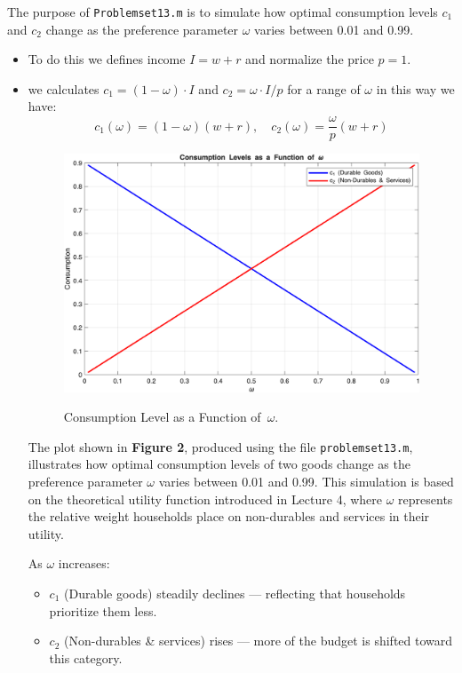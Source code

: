 \documentclass[12pt,a4paper,notitlepage]{article}
\numberwithin{equation}{section}
\begin{document}
The purpose of \texttt{Problemset13.m} is to simulate how optimal consumption levels \( c_1 \) and \( c_2 \) change as the preference parameter \( \omega \) varies between 0.01 and 0.99. 

\begin{itemize}
    \item To do this we defines income $I = w + r$ and normalize the price $p = 1$.
    \item we calculates $c_1 = (1 - \omega) \cdot I$ and $c_2 = \omega \cdot I / p$ for a range of $\omega$ in this way we have:
\[
c_1(\omega) = (1 - \omega)(w + r), \quad
c_2(\omega) = \frac{\omega}{p}(w + r)
\]



\begin{figure} [H]
	\centering
	\includegraphics[width = 1 \textwidth]{Consumption Level.png}
	\label{fig:locally}
	\caption{Consumption Level as a Function of\ $\omega$.}
\end{figure}

The plot shown in \textbf{Figure 2}, produced using the file \texttt{problemset13.m}, illustrates how optimal consumption levels of two goods change as the preference parameter \( \omega \) varies between 0.01 and 0.99. This simulation is based on the theoretical utility function introduced in {Lecture 4}, where \( \omega \) represents the relative weight households place on non-durables and services in their utility.

As \( \omega \) increases:
\begin{itemize}
  \item \( c_1 \) (Durable goods) steadily declines — reflecting that households prioritize them less.
  \item \( c_2 \) (Non-durables \& services) rises — more of the budget is shifted toward this category.
\end{itemize}


\end{itemize}
\end{document}
